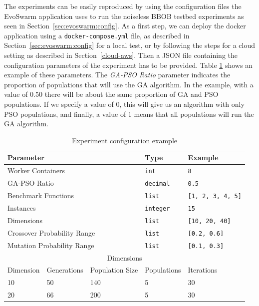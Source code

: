 \documentclass[review]{elsarticle}
\begin{document}
The experiments can be easily reproduced by using the configuration
files the EvoSwarm application uses to run the noiseless BBOB testbed
experiments as seen in Section~\ref{sec:evoswarm:config}. 
As a first step, we can deploy the docker application using a
{\tt docker-compose.yml} file, as described in Section~\ref{sec:evoswarm:config} for a local
test, or by following the steps for a cloud setting as described in Section~\ref{cloud-aws}. 
Then a JSON file containing the configuration parameters of the
experiment has to be provided.  Table \ref{tab:params} shows an example of these
parameters. The {\em GA-PSO Ratio} parameter indicates the proportion of
populations that will use the GA algorithm.  In the example, with a value of
$0.50$ there will be about the same proportion of GA and PSO populations. If we
specify a value of $0$, this will give us an algorithm with only PSO
populations, and finally, a value of  $1$ means that all populations will run
the GA algorithm. 

\begin{table}[h!tbp]
  \small
  \caption{ Experiment configuration example 
  }
  \label{tab:params}
  \centering
  \small
  \begin{tabular}{|l|l|l|l|l|}
    \hline
    \multicolumn{3}{|l|}{Parameter}                    & Type             & Example         \\ \hline
    \multicolumn{3}{|l|}{Worker Containers}        & \texttt{int}     & \texttt{8} \\ \hline
    \multicolumn{3}{|l|}{GA-PSO Ratio}                 & \texttt{decimal} & \texttt{0.5}    \\  \hline
    \multicolumn{3}{|l|}{Benchmark Functions}          & \texttt{list}    & \texttt{[1, 2, 3, 4, 5]} \\ \hline
    \multicolumn{3}{|l|}{Instances}                    & \texttt{integer}    & \texttt{15} \\ \hline
    \multicolumn{3}{|l|}{Dimensions}                   & \texttt{list}    & \texttt{[10, 20, 40]}        \\ \hline
    \multicolumn{3}{|l|}{Crossover Probability Range}  & \texttt{list}    & \texttt{[0.2, 0.6]}      \\ \hline
    \multicolumn{3}{|l|}{Mutation  Probability Range}  & \texttt{list}    & \texttt{[0.1, 0.3]}      \\ \hline
    \multicolumn{5}{|c|}{Dimensions}                                                      \\ \hline  
    Dimension               & Generations & Population Size & Populations  &     Iterations    \\ \hline
            10              & 50      & 140                 &      5                 & 30                \\ \hline
            20              & 66      & 200                 &      5                 & 30               \\ \hline
  \end{tabular}
\end{table}
\end{document}
